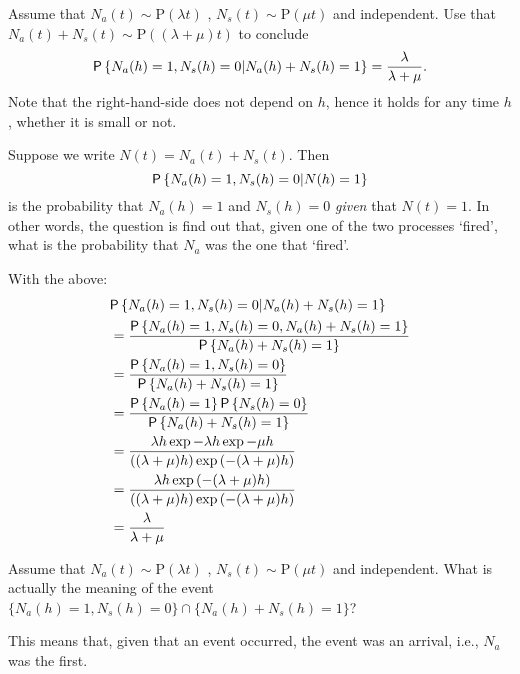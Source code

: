 \begin{exercise} Assume that
  $N_a(t)\sim \text{P}(\lambda t)$ , $N_s(t) \sim \text{P}(\mu t)$ and
  independent. Use that  $N_a(t) + N_s(t) \sim \text{P}((\lambda + \mu)t)$ to conclude
    \begin{equation*}
    \P{N_a(h) = 1,  N_s(h) = 0 | N_a(h) + N_s(h) = 1} =
\frac{\lambda}{\lambda+\mu}.
    \end{equation*}
    Note that the right-hand-side does not depend on $h$, hence it
    holds for any time $h$, whether it is small or not.  
    \begin{hint}
Suppose
      we write $N(t)=N_a(t) + N_s(t)$. Then
      \begin{equation*}
      \P{N_a(h) = 1, N_s(h) = 0 | N(h) = 1}
      \end{equation*}
      is the probability that $N_a(h)=1$ and $N_s(h)=0$ \emph{given}
      that $N(t)=1$. In other words, the question is find out that,
      given one of the two processes `fired', what is the probability
      that $N_a$ was the one that `fired'.
    \end{hint}
    \begin{solution}
  With the above:
  \begin{equation*}
    \begin{split}
&    \P{N_a(h) = 1,  N_s(h) = 0 | N_a(h) + N_s(h) = 1} \\
&= \frac{\P{N_a(h) = 1,  N_s(h) = 0, N_a(h) + N_s(h) = 1} }{ \P{N_a(h) + N_s(h) = 1}} \\ 
&= \frac{\P{N_a(h) = 1,  N_s(h) = 0}}{ \P{N_a(h) + N_s(h) = 1}} \\ 
&= \frac{\P{N_a(h) = 1}\P{N_s(h) = 0}}{ \P{N_a(h) + N_s(h) = 1}} \\ 
&= \frac{\lambda h \exp{-\lambda h} \exp{-\mu h}}{((\lambda+\mu)h)\exp{(-(\lambda+\mu)h)}}\\
&= \frac{\lambda h \exp{(-(\lambda + \mu)h)}}{((\lambda+\mu)h)\exp{(-(\lambda+\mu)h)}}\\
&= \frac{\lambda}{\lambda+\mu}
    \end{split}
  \end{equation*}
    \end{solution}
\end{exercise}


\begin{exercise}
 Assume that $N_a(t)\sim \text{P}(\lambda t)$ ,
  $N_s(t) \sim \text{P}(\mu t)$ and independent.  What is actually the
  meaning of the event
  $\{N_a(h) = 1, N_s(h) = 0\}\cap\{N_a(h) + N_s(h) = 1\}$?
    \begin{solution}
 This means that, given that an event occurred, the event was an arrival, i.e., $N_a$ was the first.
    \end{solution}
\end{exercise}


